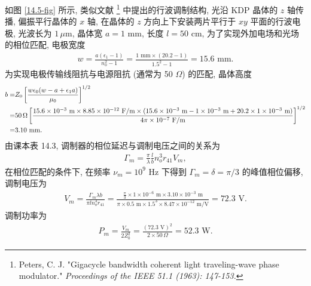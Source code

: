 \documentclass{note}
\begin{document}
\begin{sol}
    如图 \ref{14.5-fig} 所示, 类似文献 \footnote{Peters, C. J. "Gigacycle bandwidth coherent light traveling-wave phase modulator." \itshape{Proceedings of the IEEE} 51.1 (1963): 147-153.} 中提出的行波调制结构, 光沿 KDP 晶体的 $z$ 轴传播, 偏振平行晶体的 $x$ 轴, 在晶体的 $z$ 方向上下安装两片平行于 $xy$ 平面的行波电极, 光波长为 $1\,\mu$m, 晶体宽 $a=1$ mm, 长度 $l=50$ cm, 为了实现外加电场和光场的相位匹配, 电极宽度
    \begin{align}
        w=\frac{a(\epsilon_1-1)}{n_o^2-1}=\frac{1\text{ mm}\times(20.2-1)}{1.5^2-1}=15.6\text{ mm}.
    \end{align}
    为实现电极传输线阻抗与电源阻抗 (通常为 50 $\Omega$) 的匹配, 晶体高度
    \begin{align}
        \notag b=&Z_0\left[\frac{w\epsilon_0(w-a+\epsilon_1a)}{\mu_0}\right]^{1/2}\\
        \notag=&50\,\Omega\left[\frac{15.6\times 10^{-3}\text{ m}\times8.85\times 10^{-12}\text{ F/m}\times(15.6\times 10^{-3}\text{ m}-1\times 10^{-3}\text{ m}+20.2\times 1\times 10^{-3}\text{ m})}{4\pi\times 10^{-7}\text{ F/m}}\right]^{1/2}\\
        =&3.10\text{ mm}.
    \end{align}
    由课本表 14.3, 调制器的相位延迟与调制电压之间的关系为
    \begin{align}
        \Gamma_m=\frac{\pi}{\lambda}\frac{l}{b}n_o^3r_{41}V_m,
    \end{align}
    在相位匹配的条件下, 在频率 $\nu_m=10^9$ Hz 下得到 $\Gamma_m=\delta=\pi/3$ 的峰值相位偏移, 调制电压为
    \begin{align}
        V_m=\frac{\Gamma_m\lambda b}{\pi ln_o^3r_{41}}=\frac{\frac{\pi}{3}\times 1\times 10^{-6}\text{ m}\times 3.10\times 10^{-3}\text{ m}}{\pi\times 0.5\text{ m}\times1.5^3\times 8.47\times 10^{-12}\text{ m/V}}=72.3\text{ V}.
    \end{align}
    调制功率为
    \begin{align}
        P_m=\frac{V_m}{2Z_0^2}=\frac{(72.3\text{ V})^2}{2\times 50\,\Omega}=52.3\text{ W}.
    \end{align}
    \begin{figure}[H]
        \centering

\end{figure}
\end{sol}
\end{document}
